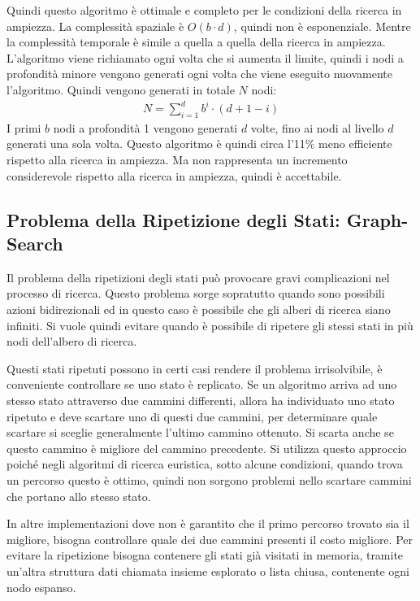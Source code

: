 \documentclass{article}
\numberwithin{equation}{subsection}
\begin{document}
Quindi questo algoritmo è ottimale e completo per le condizioni della ricerca in ampiezza. 
La complessità spaziale è $O(b\cdot d)$, quindi non è esponenziale. Mentre la complessità 
temporale è simile a quella a quella della ricerca in ampiezza. L'algoritmo viene richiamato 
ogni volta che si aumenta il limite, quindi i nodi a profondità minore vengono generati 
ogni volta che viene eseguito nuovamente l'algoritmo. Quindi vengono generati in totale $N$ nodi:
\begin{gather*}
    N=\displaystyle\sum_{i=1}^db^i\cdot(d+1-i)
\end{gather*}
I primi $b$ nodi a profondità 1 vengono generati $d$ volte, fino ai nodi al livello $d$ generati 
una sola volta. Questo algoritmo è quindi circa l'11\% meno efficiente rispetto alla ricerca in 
ampiezza. Ma non rappresenta un incremento considerevole rispetto alla ricerca in ampiezza, 
quindi è accettabile. 

\subsection{Problema della Ripetizione degli Stati: Graph-Search}

Il problema della ripetizioni degli stati può provocare gravi complicazioni nel processo 
di ricerca. Questo problema sorge sopratutto quando sono possibili azioni bidirezionali ed 
in questo caso è possibile che gli alberi di ricerca siano infiniti. Si vuole quindi evitare 
quando è possibile di ripetere gli stessi stati in più nodi dell'albero di ricerca. 

Questi stati ripetuti possono in certi casi rendere il problema irrisolvibile, è conveniente 
controllare se uno stato è replicato. Se un algoritmo arriva ad uno stesso stato attraverso 
due cammini differenti, allora ha individuato uno stato ripetuto e deve scartare uno di questi 
due cammini, per determinare quale scartare si sceglie generalmente l'ultimo cammino ottenuto. 
Si scarta anche se questo cammino è migliore del cammino precedente. Si utilizza questo 
approccio poiché negli algoritmi di ricerca euristica, sotto alcune condizioni, quando trova 
un percorso questo è ottimo, quindi non sorgono problemi nello scartare cammini che portano allo 
stesso stato. 

In altre implementazioni dove non è garantito che il primo percorso trovato sia il migliore, 
bisogna controllare quale dei due cammini presenti il costo migliore. 
Per evitare la ripetizione bisogna contenere gli stati già visitati in memoria, tramite 
un'altra struttura dati chiamata insieme esplorato o lista chiusa, contenente ogni nodo 
espanso. 
\end{document}
